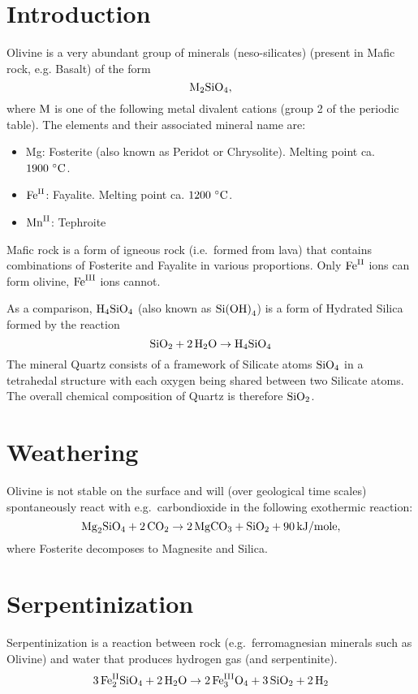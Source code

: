\documentclass[a4paper,14pt]{extarticle}
\def\H{{\rm H}}
\def\O{{\rm O}}
\def\M{{\rm M}}
\def\C{{\rm C}}
\def\Fe{{\rm Fe}}
\def\Mg{{\rm Mg}}
\def\Mn{{\rm Mn}}
\def\Si{{\rm Si}}
\def\II{{\rm II}}
\def\III{{\rm III}}
\begin{document}

\section{Introduction}

Olivine\cite{olivine} is a very abundant group of minerals (neso-silicates\cite{orthosilicate}) (present in Mafic rock,
e.g. Basalt) of the form
\[
    \M_2\Si\O_4,
\]
where $\M$ is one of the following metal divalent cations (group 2 of the periodic table).  The
elements and their associated mineral name are:
\begin{itemize}
    \itemsep=0em
    \item\Mg: Fosterite (also known as Peridot or Chrysolite). Melting point ca. $1900\ {}^\circ\C$.
    \item$\Fe^{\II}$: Fayalite. Melting point ca. $1200\ {}^\circ\C$.
    \item$\Mn^{\II}$: Tephroite
\end{itemize}
Mafic\cite{mafic} rock is a form of igneous rock (i.e.\ formed from lava) that contains combinations of Fosterite and Fayalite in
various proportions.  Only $\Fe^{\II}$ ions can form olivine, $\Fe^{\III}$ ions cannot.

As a comparison, $\H_4\Si\O_4$ (also known as $\Si{(\O\H)}_4$) is a form of Hydrated Silica\cite{hydrated_silica} formed
by the reaction
\[
    \Si\O_2 + 2\, \H_2\O \rightarrow \H_4\Si\O_4
\]
The mineral Quartz\cite{quartz} consists of a framework of Silicate atoms $\Si\O_4$ in a tetrahedal structure with each
oxygen being shared between two Silicate atoms. The overall chemical composition of Quartz is therefore $\Si\O_2$.


\section{Weathering}
Olivine is not stable on the surface and will (over geological time scales) spontaneously react with e.g.\ carbondioxide
in the following exothermic reaction:
\[
    \Mg_2\Si\O_4 + 2\,\C\O_2 \rightarrow 2\,\Mg\C\O_3 + \Si\O_2 + 90\, {\rm kJ/mole},
\]
where Fosterite decomposes to Magnesite and Silica.

\section{Serpentinization}

Serpentinization\cite{serpentinization} is a reaction between rock (e.g.\ ferromagnesian minerals such as Olivine) and
water that produces hydrogen gas (and serpentinite).
\[
    3\, \Fe^{\II}_2\Si \O_4 + 2\,\H_2\O \rightarrow 2\,\Fe^{\III}_3\O_4 + 3\,\Si \O_2 + 2\,\H_2
\]
\end{document}
